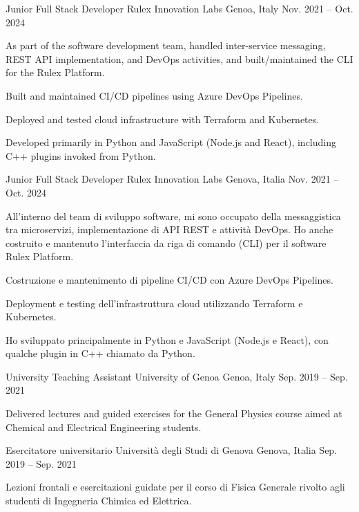 \begin{cventries}
\ifenglish
\cventry
{Junior Full Stack Developer} %
{Rulex Innovation Labs} %
{Genoa, Italy} %
{Nov. 2021 -- Oct. 2024} %
{ %
\begin{cvitems}
  \item {As part of the software development team, handled inter-service messaging, REST API implementation, and DevOps activities, and built/maintained the CLI for the Rulex Platform.}
  \item {Built and maintained CI/CD pipelines using Azure DevOps Pipelines.}
  \item {Deployed and tested cloud infrastructure with Terraform and Kubernetes.}
  \item {Developed primarily in Python and JavaScript (Node.js and React), including C++ plugins invoked from Python.}
\end{cvitems}
}
\else
\cventry
{Junior Full Stack Developer} %
{Rulex Innovation Labs} %
{Genova, Italia} %
{Nov. 2021 -- Oct. 2024} %
{ %
\begin{cvitems}
\item {
    All'interno del team di sviluppo software, mi sono occupato della messaggistica tra microservizi, implementazione di API REST e attività DevOps.
    Ho anche costruito e mantenuto l'interfaccia da riga di comando (CLI) per il software Rulex Platform.
}
\item {Costruzione e mantenimento di pipeline CI/CD con Azure DevOps Pipelines.}
\item {Deployment e testing dell'infrastruttura cloud utilizzando Terraform e Kubernetes.}
\item {Ho sviluppato principalmente in Python e JavaScript (Node.js e React), con qualche plugin in C++ chiamato da Python.}
\end{cvitems}
}
\fi


\ifenglish
\cventry
{University Teaching Assistant} %
{University of Genoa} %
{Genoa, Italy} %
{Sep. 2019 -- Sep. 2021} %
{ %
\begin{cvitems}
  \item {Delivered lectures and guided exercises for the General Physics course aimed at Chemical and Electrical Engineering students.}
\end{cvitems}
}
\else
\cventry
{Esercitatore universitario} %
{Università degli Studi di Genova} %
{Genova, Italia} %
{Sep. 2019 -- Sep. 2021} %
{ %
\begin{cvitems}
\item {Lezioni frontali e esercitazioni guidate per il corso di Fisica Generale rivolto agli studenti di Ingegneria Chimica ed Elettrica.}
\end{cvitems}
}
\fi


\end{cventries}
